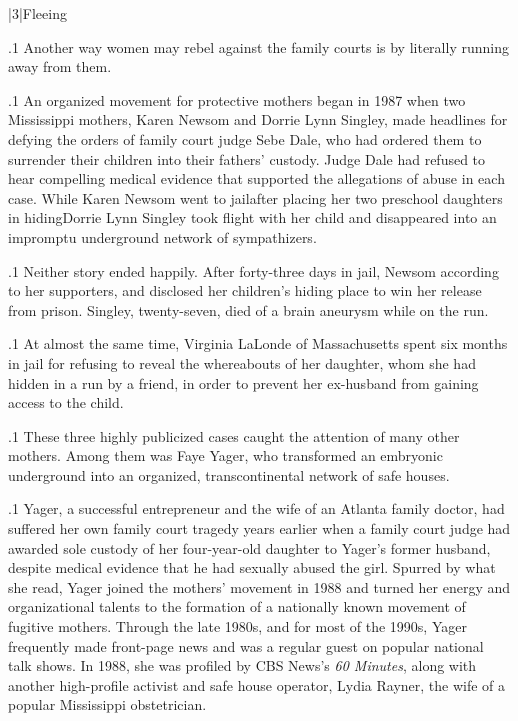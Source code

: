 \documentclass[11pt, twoside]{article}
\begin{document}
{\s|3|{Fleeing}

\p.1{%
\noindent{}Another way women may rebel against the family courts is by literally
running away from them.
}%

\p.1{%
An organized  movement for protective mothers began in 1987 when two Mississippi mothers, Karen Newsom and Dorrie
Lynn Singley, made headlines for defying the orders of family court
judge Sebe Dale, who had ordered them to surrender their children
into their fathers’ custody. Judge Dale had refused to hear compelling
medical evidence that supported the allegations of abuse in each case.
While Karen Newsom went to jail\mdash{}after placing her two preschool daughters
in hiding\mdash{}Dorrie Lynn Singley took flight with her child and disappeared into an
impromptu underground network of sympathizers.
}%

\p.1{%
Neither story ended happily. After forty-three days in jail, Newsom
 according to her supporters, and disclosed her children’s hiding
place to win her release from prison. Singley, twenty-seven, died of a
brain aneurysm while on the run.
}%

\p.1{%
At almost the same time, Virginia LaLonde of Massachusetts spent
six months in jail for refusing to reveal the whereabouts of her daughter,
whom she had hidden in a  run by a friend, in order to prevent her
ex-husband from gaining access to the child.
}%

\p.1{%
These three highly publicized cases caught the attention of many
other mothers. Among them was Faye Yager, who transformed an embryonic underground into an organized, transcontinental network of safe
houses.
}%

\p.1{%
Yager, a successful entrepreneur and the wife of an Atlanta family
doctor, had suffered her own family court tragedy years earlier when
a family court judge had awarded sole custody of her four-year-old
daughter to Yager’s former husband, despite medical evidence that he
had sexually abused the girl. Spurred by what she read, Yager joined the
mothers’ movement in 1988 and turned her energy and organizational
talents to the formation of a nationally known movement of fugitive
mothers. Through the late 1980s, and for most of the 1990s, Yager
frequently made front-page news and was a regular guest on popular
national talk shows. In 1988, she was profiled by
CBS News’s \textit{60 Minutes}, along with another high-profile activist and safe house operator,
Lydia Rayner, the wife of a popular Mississippi obstetrician.
}%

}
\end{document}
